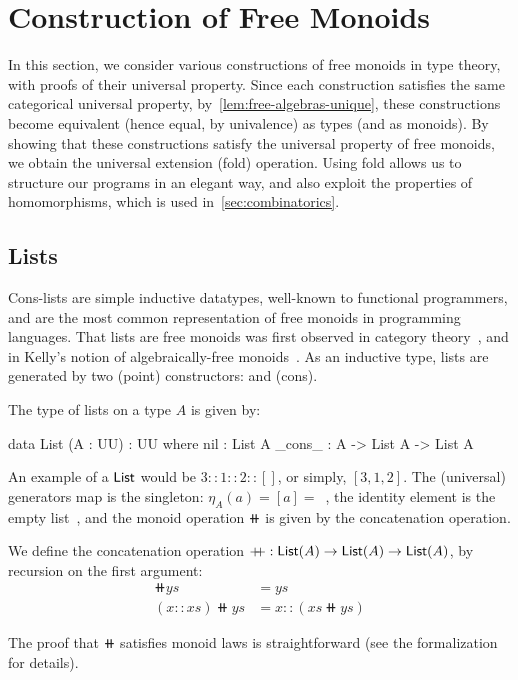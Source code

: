 \section{Construction of Free Monoids}
\label{sec:monoids}

In this section, we consider various constructions of free monoids in type theory, with proofs of their universal
property.
%
Since each construction satisfies the same categorical universal property, by~\cref{lem:free-algebras-unique},
these constructions become equivalent (hence equal, by univalence) as types (and as monoids).
%
By showing that these constructions satisfy the universal property of free monoids, we obtain the universal extension
(fold) operation.
%
Using fold allows us to structure our programs in an elegant way, and also exploit the properties of homomorphisms,
which is used in~\ref{sec:combinatorics}.

\subsection{Lists}
\label{mon:lists}

Cons-lists are simple inductive datatypes, well-known to functional programmers,
and are the most common representation of free monoids in programming languages.
%
That lists are free monoids was first observed in category theory~\cite{dubucFreeMonoids1974}, and in Kelly's notion of
algebraically-free monoids~\cite{kellyUnifiedTreatmentTransfinite1980}.
%
As an inductive type, lists are generated by two (point) constructors:  and  (cons).
\begin{definition}[Lists]
    \label{def:lists}
    The type of lists on a type $A$ is given by:
    \begin{code}
data List (A : UU) : UU where
  nil : List A
  _cons_ : A -> List A -> List A
\end{code}
\end{definition}

An example of a $\operatorname{\mathsf{List}}$ would be $3 :: 1 :: 2 :: []$, or simply, $[3, 1, 2]$.
%
The (universal) generators map is the singleton: $\eta_A(a) = [a] =$~,
the identity element is the empty list~,
and the monoid operation $\doubleplus$ is given by the concatenation operation.

\begin{definition}[Concatenation]
    We define the concatenation operation $\mathbin{+\kern -0.4em+} : \operatorname{\mathsf{List}}(A) \to \operatorname{\mathsf{List}}(A) \to \operatorname{\mathsf{List}}(A)$,
    by recursion on the first argument:
    \begin{align*}
        [] \doubleplus ys        & = ys                       \\
        (x :: xs) \doubleplus ys & = x :: (xs \doubleplus ys)
    \end{align*}
\end{definition}
The proof that $\doubleplus$ satisfies monoid laws is straightforward (see the formalization for details).

